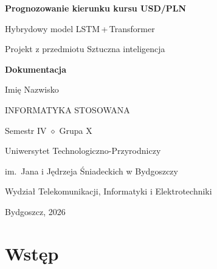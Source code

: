 \documentclass[12pt,a4paper]{report}
\newcommand{\autorDokumentacji}{Imię Nazwisko}
\newcommand{\grupaStudencka}{Grupa X}
\begin{document}
\begin{titlepage}
    \centering
    \vspace*{1.5cm}

    {\LARGE\bfseries Prognozowanie kierunku kursu USD/PLN\par}
    \vspace{0.8cm}
    {\Large Hybrydowy model LSTM\,+\,Transformer\par}
    \vspace{1.2cm}
    {\large Projekt z przedmiotu Sztuczna inteligencja\par}
    \vspace{0.4cm}
    {\Large\bfseries Dokumentacja\par}

    \vfill

    {\large \autorDokumentacji\par}
    \vspace{0.6cm}
    {\normalsize INFORMATYKA STOSOWANA\par}
    {\normalsize Semestr IV $\diamond$ \grupaStudencka\par}

    \vspace{1.5cm}

    {\large Uniwersytet Technologiczno-Przyrodniczy\par}
    {\large im.\ Jana i Jędrzeja Śniadeckich w Bydgoszczy\par}
    \vspace{0.4cm}
    {\normalsize Wydział Telekomunikacji, Informatyki i Elektrotechniki\par}

    \vspace{1.5cm}
    {\large Bydgoszcz, 2026\par}
\end{titlepage}

\tableofcontents

\newpage




\chapter{Wstęp}





\end{document}
